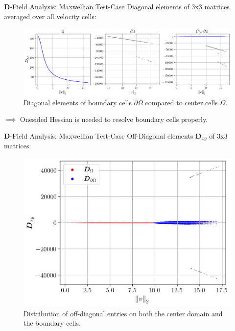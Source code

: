 \begin{frame}[c]{$\boldsymbol D$-Field Analysis: Maxwellian Test-Case}
    Diagonal elements of 3x3 matrices averaged over all velocity cells:
    \begin{figure}[!htb]
        \centering
        \captionsetup{justification=centering}
      \includegraphics[width=1\linewidth]{figures/Dxx_avg_maxwellian.png}
      \caption{Diagonal elements of boundary cells $\partial \Omega$ compared to center cells $\Omega$.}
      \label{fig:Fd_asymptotic_behavior_2nd}
    \end{figure}
    $\implies$ Onesided Hessian is needed to resolve boundary cells properly.
\end{frame}

\begin{frame}[c]{$\boldsymbol D$-Field Analysis: Maxwellian Test-Case}
    Off-Diagonal elements $\boldsymbol D_{xy}$ of 3x3 matrices:
    \begin{figure}[!htb]
        \centering
        \captionsetup{justification=centering}
      \includegraphics[width=0.7\linewidth]{figures/Dxy_maxwellian_nolog.png}
      \caption{Distribution of off-diagonal entries on both the center domain and the boundary cells.}
      \label{fig:Fd_asymptotic_behavior_reference}
    \end{figure}
\end{frame}

